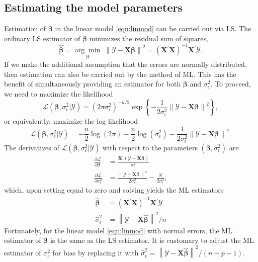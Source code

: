 \documentclass[cmfont,usenames,dvipsnames,leqno]{afit-etd}\usepackage[]{graphicx}\usepackage[]{color}
\newcommand{\loglik}{\mathscr{L}}
\newcommand{\norm}[1]{\left\|#1\right\|}
\newcommand{\trans}{\ensuremath{^\prime}}
\newcommand{\bc}[1]{\ensuremath{\bm{\mathcal{#1}}}}
\newcommand{\mc}[1]{\ensuremath{\mathcal{#1}}}
\newcommand{\wh}[1]{\ensuremath{\widehat{#1}}}
\newcommand{\argmin}[1]{\underset{#1}{\operatorname{arg}\!\operatorname{min}}\;}
\newcommand{\X}{\ensuremath{\bm{X}}}
\begin{document}
\subsection{Estimating the model parameters}
Estimation of $\bm{\beta}$ in the linear model \eqref{eqn:linmod} can be carried out via \ac{LS}. The ordinary \ac{LS} estimator of $\bm{\beta}$ minimizes the residual sum of squares, 
\begin{equation}
\label{eqn:beta-ols}
  \wh{\bm{\beta}} = \argmin{\bm{\beta}} \norm{\bc{Y} - \X\bm{\beta}}^2 = \left(\X\trans\X\right)^{-1}\X\trans\bc{Y}.
\end{equation}
If we make the additional assumption that the errors are normally distributed, then estimation can also be carried out by the method of \ac{ML}. This has the benefit of simultaneously providing an estimator for both $\bm{\beta}$ and $\sigma_\epsilon^2$. To proceed, we need to maximize the likelihood
\begin{equation*}
  \mc{L}\left(\bm{\beta}, \sigma_\epsilon^2 | \bc{Y}\right) = \left(2\pi\sigma_\epsilon^2\right)^{-n/2}\exp\left\{ -\frac{1}{2\sigma_\epsilon^2}\norm{\bc{Y} - \X\bm{\beta}}^2 \right\},
\end{equation*}
or equivalently, maximize the log likelihood
\begin{equation*}
  \loglik\left(\bm{\beta}, \sigma_\epsilon^2 | \bc{Y}\right) = -\frac{n}{2}\log\left(2\pi\right) - \frac{n}{2}\log\left(\sigma_\epsilon^2\right) - \frac{1}{2\sigma_\epsilon^2}\norm{\bc{Y} - \X\bm{\beta}}^2.
\end{equation*}
The derivatives of $\loglik(\bm{\beta}, \sigma_\epsilon^2 | \bc{Y})$ with respect to the parameters $\left(\bm{\beta}, \sigma_\epsilon^2\right)$ are
\begin{align*}
  \frac{\partial\loglik}{\partial\bm{\beta}} &= \frac{\X\trans(\bc{Y} - \X\bm{\beta})}{\sigma_\epsilon^2}\\
  \frac{\partial\loglik}{\partial\sigma_\epsilon^2} &= \frac{\norm{\bc{Y} - \X\bm{\beta}}^2}{2\sigma_\epsilon^2} - \frac{N}{2\sigma_\epsilon^2},
\end{align*}
which, upon setting equal to zero and solving yields the \ac{ML} estimators
\begin{align*}
  \wh{\bm{\beta}} &= (\X\trans\X)^{-1}\X\trans\bc{Y} \\
  \wh{\sigma}_\epsilon^2 &= \norm{\bc{Y} - \X\wh{\bm{\beta}}}^2/n
\end{align*}
Fortunately, for the linear model \eqref{eqn:linmod} with normal errors, the \ac{ML} estimator of $\bm{\beta}$ is the same as the \ac{LS} estimator. It is customary to adjust the \ac{ML} estimator of $\sigma_\epsilon^2$ for bias by replacing it with $\wh{\sigma}_\epsilon^2 = \norm{\bc{Y} - \X\wh{\bm{\beta}}}^2/(n-p-1)$.
\end{document}
